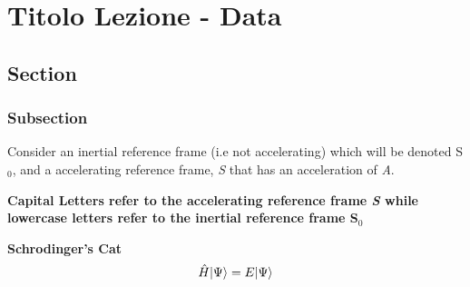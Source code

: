 \chapter{Titolo Lezione - Data}

\section{Section}
\subsection{Subsection}
Consider an inertial reference frame (i.e not accelerating) which will be denoted S$_0$, and a accelerating reference frame, \textit{S} that has an acceleration of \textit{A}. 

\begin{note}
\textbf{Capital Letters refer to the accelerating reference frame \textit{S} while lowercase letters refer to the inertial reference frame S$_0$}
\end{note}

\begin{shaded}
\textbf{Schrodinger's Cat} \\
\begin{equation}
\hat{H} \lvert\Psi\rangle = E \lvert\Psi\rangle
\end{equation}
\end{shaded}

\newpage